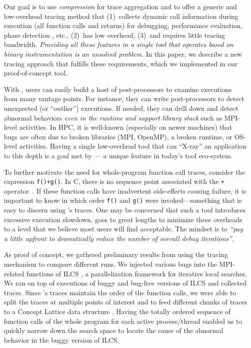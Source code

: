 %
Our goal is to use \textit{compression} for trace aggregation and to offer
a generic and low-overhead tracing method that
(1)~collects dynamic call information during execution (all function calls and returns) for debugging, performance evaluation, phase detection \cite{cbb}, etc.,
(2)~has low overhead,
(3)~and requires little tracing bandwidth.
%
{\em Providing all these features in a single tool
that operates based on binary instrumentation
is an unsolved problem.}
%
In this paper, we describe a new tracing approach that fulfills these requirements, which we implemented in our proof-of-concept \parlot tool.


%
With \parlot, users can easily build a host of post-processors to examine
executions from many vantage points.
%
For instance, they can write post-processors
to detect unexpected (or ``outlier'') executions.
%
If needed, they can
drill down and detect abnormal behaviors {\em even in the runtime and
support library stack} such as MPI-level activities.
%
In HPC, it is well-known (especially on newer machines) that bugs are often due to
broken libraries (MPI, OpenMP), a broken runtime, or OS-level activities.
%
Having a single low-overhead tool that can ``X-ray'' an application to this depth is a goal met by \parlot --- a unique feature in today's tool eco-system.

To further motivate the need for whole-program function call
traces, consider the expression {\tt f()+g()}.
%
In C, there is no sequence point associated with the {\tt +}
operator~\cite{sequence-points-in-C}.
%
If these function calls have inadvertent side-effects causing
failure, it is important to know in which order {\tt f()}
and {\tt g()} were invoked---something that is easy to discern using
\parlot 's traces.
%
One may be concerned that such a tool introduces excessive execution slowdown.
%
\parlot goes to great lengths to minimize these overheads to a level that we believe most users will find acceptable. The mindset is to \textit{``pay a little upfront to dramatically reduce the number of overall debug iterations''}.

%
As proof of concept, we gathered preliminary results from using the \parlot tracing mechanism to compare different runs.
%
We injected various bugs into the MPI-related functions of ILCS \cite{ilcs}, a parallelization framework for iterative local searches.
%
We ran \parlot on top of executions of buggy and bug-free versions of ILCS and collected traces.
%
Since \parlot's traces maintain the order of the function calls, we were able to split the traces at multiple points of interest and to feed different chunks of traces to a Concept Lattice data structure \cite{clbook} \cite{clconst}.
%
Having the totally ordered sequence of function calls of the whole program for each active process/thread enabled us to quickly narrow down the search space to locate the cause of the abnormal behavior in the buggy version of ILCS.


